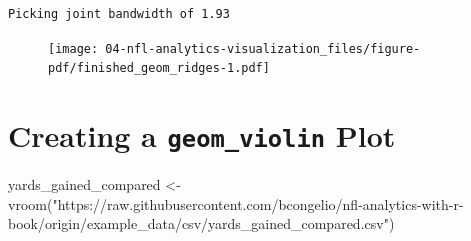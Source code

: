 \documentclass[
  letterpaper,
]{krantz}
\newenvironment{Shaded}{\begin{snugshade}}{\end{snugshade}}
\newcommand{\FunctionTok}[1]{\textcolor[rgb]{0.28,0.35,0.67}{#1}}
\newcommand{\NormalTok}[1]{\textcolor[rgb]{0.00,0.23,0.31}{#1}}
\newcommand{\OtherTok}[1]{\textcolor[rgb]{0.00,0.23,0.31}{#1}}
\newcommand{\StringTok}[1]{\textcolor[rgb]{0.13,0.47,0.30}{#1}}
\begin{document}
\begin{verbatim}
Picking joint bandwidth of 1.93
\end{verbatim}

\begin{figure}[H]

{\centering \texttt{[image: 04-nfl-analytics-visualization\_files/figure-pdf/finished\_geom\_ridges-1.pdf]}

}

\end{figure}

\hypertarget{creating-a-geom_violin-plot}{%
\section{\texorpdfstring{Creating a \texttt{geom\_violin}
Plot}{Creating a geom\_violin Plot}}\label{creating-a-geom_violin-plot}}

\begin{Shaded}
\begin{Highlighting}[]
\NormalTok{yards\_gained\_compared }\OtherTok{\textless{}{-}}
  \FunctionTok{vroom}\NormalTok{(}\StringTok{"https://raw.githubusercontent.com/bcongelio/nfl{-}analytics{-}with{-}r{-}book/origin/example\_data/csv/yards\_gained\_compared.csv"}\NormalTok{)}
\end{Highlighting}
\end{Shaded}
\end{document}
